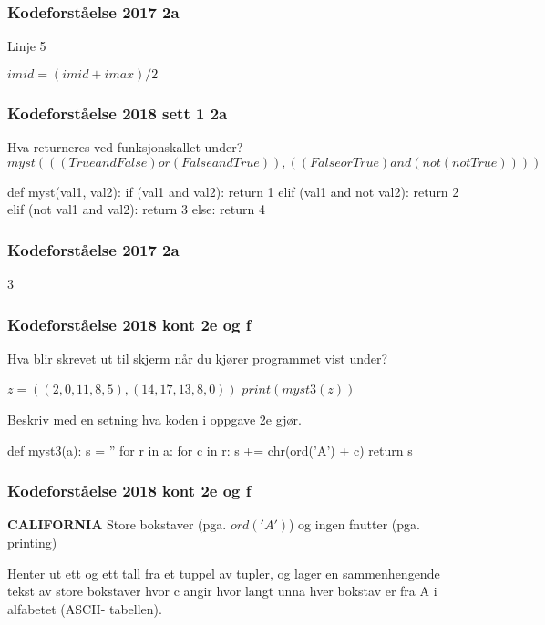 \begin{frame}
    \frametitle{Kodeforståelse 2017 2a}

    Linje 5

    $imid = (imid + imax) / 2$

\end{frame}

\begin{frame}[fragile]
    \frametitle{Kodeforståelse 2018 sett 1 2a}

    Hva returneres ved funksjonskallet under? 
    $myst(((True and False) or (False and True)), ((False or True) and (not(not True))))$

\begin{python}
def myst(val1, val2):
    if (val1 and val2):
        return 1 
    elif (val1 and not val2): 
        return 2
    elif (not val1 and val2): 
        return 3 
    else: 
        return 4
\end{python}

\end{frame}

\begin{frame}
    \frametitle{Kodeforståelse 2017 2a}

    3

\end{frame}

\begin{frame}[fragile]
    \frametitle{Kodeforståelse 2018 kont 2e og f}

    Hva blir skrevet ut til skjerm når du kjører programmet vist under?

    $z = ((2, 0, 11, 8, 5), (14, 17, 13, 8, 0))$
    $print(myst3(z))$

    Beskriv med en setning hva koden i oppgave 2e gjør. 
    
\begin{python}
def myst3(a): 
	s  = ''
	for r in a: 
		for c in r: 
			s += chr(ord('A') + c)
	return s
\end{python}

\end{frame}

\begin{frame}
    \frametitle{Kodeforståelse 2018 kont 2e og f}

    \textbf{CALIFORNIA}
    Store bokstaver (pga. $ord('A')$) og ingen fnutter (pga. printing)

    Henter ut ett og ett tall fra et tuppel av tupler, og lager en sammenhengende tekst av store bokstaver hvor c angir hvor langt unna hver bokstav er fra A i alfabetet (ASCII- tabellen).

\end{frame}
